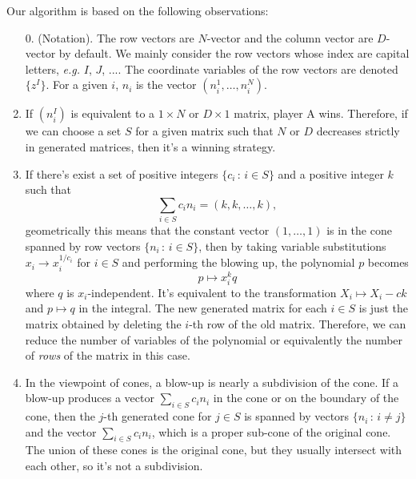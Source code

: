 \documentclass[12pt]{article}
\theoremstyle{definition}
\theoremstyle{plain}
\begin{document}
Our algorithm is based on the following observations:
\begin{enumerate}
	\item[0.](Notation). The row vectors are $N$-vector and the column vector are $D$-vector by default. We mainly consider the row vectors whose index are capital letters, \textit{e.g.} $I$, $J$, .... 
	The coordinate variables of the row vectors are denoted  $\{z^I\}$.
	For a given $i$, $n_i$ is the vector $(n_i^1,\dots,n_i^N)$.
	
	\item If $(n^I_i)$ is equivalent to a $1\times N$ or $D\times 1$ matrix, player A wins. 
	Therefore, if we can choose a set $S$ for a given matrix such that $N$ or $D$ 
	decreases strictly in generated matrices, then it's a winning strategy.

	\item If there's exist a set of positive integers $\{c_i\,:\,i\in S\}$ and a 
	positive integer $k$ such that
	\begin{equation}\label{linearprog}
		\sum_{i\in S} c_i n_i = (k,k,\dots,k),
	\end{equation}	
	geometrically this means that the constant vector $(1,\dots,1)$ is in the cone spanned by row vectors $\{n_i\,:\,i\in S\}$,  then by taking variable substitutions $x_{i}\to x_{i}^{1/c_{i}}$  for $i\in S$ and performing the blowing up, 
	the polynomial $p$ becomes
	\[
		p\mapsto x_i^k q
	\]
	where $q$ is $x_{i}$-independent. 
	It's equivalent to the transformation $X_i\mapsto X_i-ck$ and $p\mapsto q$ 
	in the integral. The new generated matrix for each $i\in S$ is just the matrix
	obtained by deleting the $i$-th row of the old matrix. 
	Therefore, we can reduce the number of variables of the polynomial or equivalently 
	the number of \emph{rows} of the matrix in this case.
	
	\item In the viewpoint of cones, 
	a blow-up is nearly a subdivision of the cone.
	If a blow-up produces a vector $\sum_{i\in S} c_i n_i$ in the cone 
	or on the boundary of the cone, 
	then the $j$-th generated cone for $j\in S$ is spanned by 
	vectors $\{n_i\,:\,i\neq j\}$ and the vector $\sum_{i\in S} c_i n_i$,
	which is a proper sub-cone of the original cone. 
	The union of these cones is the original cone,
	but they usually intersect with each other, so it's not a subdivision. 


\end{enumerate}
\end{document}

